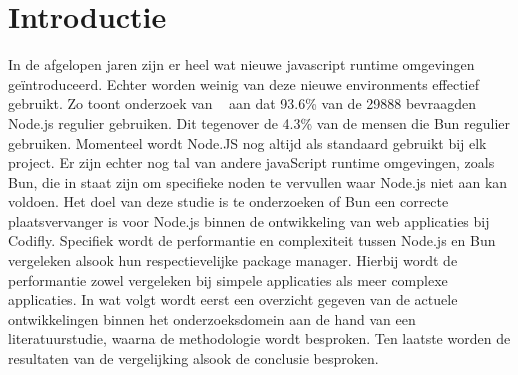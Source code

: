 
\section{Introductie}%
\label{sec:introductie}
In de afgelopen jaren zijn er heel wat nieuwe javascript runtime omgevingen geïntroduceerd. 
Echter worden weinig van deze nieuwe environments effectief gebruikt. 
Zo toont onderzoek van ~\textcite{Greif2022} aan dat 93.6\% van de 29888 bevraagden Node.js regulier gebruiken.
Dit tegenover de 4.3\% van de mensen die Bun regulier gebruiken.
Momenteel wordt Node.JS nog altijd als standaard gebruikt bij elk project. 
Er zijn echter nog tal van andere javaScript runtime omgevingen, zoals Bun, 
die in staat zijn om specifieke noden te vervullen waar Node.js niet aan kan voldoen.
Het doel van deze studie is te onderzoeken of Bun een correcte plaatsvervanger is voor Node.js 
binnen de ontwikkeling van web applicaties bij Codifly. 
Specifiek wordt de performantie en complexiteit tussen Node.js en Bun vergeleken alsook 
hun respectievelijke package manager. 
Hierbij wordt de performantie zowel vergeleken bij simpele applicaties als meer complexe applicaties.
In wat volgt wordt eerst een overzicht gegeven van de actuele ontwikkelingen binnen het
onderzoeksdomein aan de hand van een literatuurstudie, waarna de methodologie wordt besproken.
Ten laatste worden de resultaten van de vergelijking alsook de conclusie besproken.



